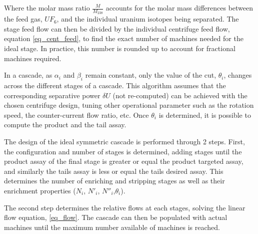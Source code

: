 Where the molar mass ratio $\frac{M}{M_{238}}$ accounts for the molar mass
differences between the feed gas, $UF_6$, and the individual uranium isotopes
being separated. The stage feed flow can then be divided by the individual
centrifuge feed flow, equation \eqref{eq_cent_feed}, to find the exact number of
machines needed for the ideal stage. In practice, this number is rounded up to
account for fractional machines required.


In a cascade, as $\alpha_{i}$ and $\beta_{i}$ remain constant, only the value of
the cut, $\theta_{i}$, changes across the different stages of a cascade.  This
algorithm assumes that the corresponding separative power $\delta U$ (not
re-computed) can be achieved with the chosen centrifuge design, tuning other
operational parameter such as the rotation speed, the counter-current flow
ratio, etc.  Once $\theta_{i}$ is determined, it is possible to compute the
product and the tail assay.


The design of the ideal symmetric cascade is performed through 2 steps. First,
the configuration and number of stages is determined, adding stages until the
product assay of the final stage is greater or equal the product targeted assay,
and similarly the tails assay is less or equal the tails desired assay.  This
determines the number of enriching and stripping stages as well as their
enrichment properties ($N_{i}$, $N'_{i}$, $N''_{i}$,$\theta_{i}$).


The second step determines the relative flows at each stages, solving the linear
flow equation, \eqref{eq_flow}.
The cascade can then be populated with actual machines until the maximum number
available of machines is reached.

